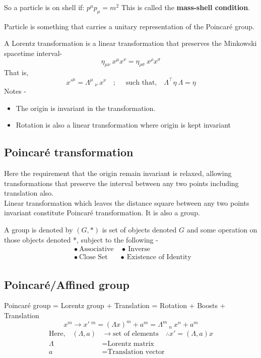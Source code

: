 \documentclass[14pt]{article} %
\begin{document}
So a particle is on shell if: $p^\mu p_\mu = m^2$
This is called the \textbf{mass-shell condition}.

\begin{tcolorbox}[proofbox, title=\textbf{Question: What is a particle?}]
Particle is something that carries a unitary representation of the Poincaré group.
\end{tcolorbox}
\begin{tcolorbox}[proofbox, title=\textbf{Question: What is Lorentz transformation?}]
A Lorentz transformation is a linear transformation that preserves the Minkowski spacetime interval-
\[
\eta_{\mu \nu} ~x^\mu x^\nu = \eta_{\rho \sigma} ~x^\rho x^\sigma 
\]
That is,
\[
x'^{\mu} = \Lambda^{\mu}~_{\nu}~x^\nu \quad;\quad \text{ such that,}\quad \Lambda^\top \eta~ \Lambda=\eta
\]
Notes -
\begin{itemize}
    \item The origin is invariant in the transformation. 
    \item Rotation is also a linear transformation where origin is kept invariant
\end{itemize}
\end{tcolorbox}
\subsection{Poincaré transformation}
Here the requirement that the origin remain invariant is relaxed, allowing transformations that preserve the interval between any two points including translation also. \\

Linear transformation which leaves the distance square between any two points invariant constitute Poincaré transformation. It is also a group.
\begin{tcolorbox}[proofbox, title=\textbf{Question: What are groups? \hfill (set + binary operation)}]
A group is denoted by $(G,*)$ is set of objects denoted $G$ and some operation on those objects denoted *, subject to the following -
\begin{align*}
&\bullet~\text{Associative} \quad \bullet~\text{Inverse} \\
&\bullet~\text{Close Set} \quad ~~~\bullet~\text{Existence of Identity }
\end{align*}
\end{tcolorbox}
\subsection{Poincaré/Affined group}
Poincaré group = Lorentz group + Translation 
= Rotation + Boosts + Translation 
\[
x^m \rightarrow x'~^m = (\Lambda x)^m + a^m = \Lambda^{m}~_{n}~x^n + a^m
\]
\begin{align*}
    \text{Here,} \quad (\Lambda, a) &\rightarrow \text{set of elements} \quad  \therefore x' = (\Lambda, a)x \\
    \Lambda &= \text{Lorentz matrix} \\
    a &= \text{Translation vector}
\end{align*}
\end{document}
